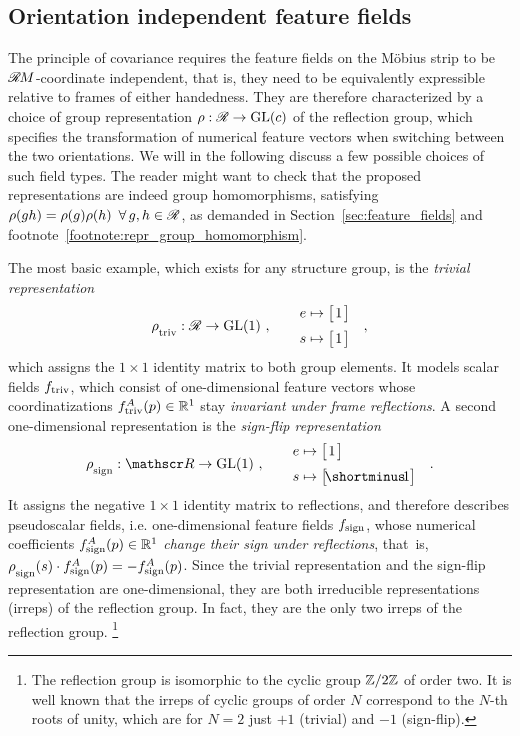\subsection{Orientation independent feature fields}
\label{sec:mobius_representations}

The principle of covariance requires the feature fields on the M\"obius strip to be $\mathscr{R}\mkern-1.8muM$-coordinate independent, that is, they need to be equivalently expressible relative to frames of either handedness.
They are therefore characterized by a choice of group representation $\rho: \mathscr{R} \to \operatorname{GL}(c)$ of the reflection group, which specifies the transformation of numerical feature vectors when switching between the two orientations.
We will in the following discuss a few possible choices of such field types.
The reader might want to check that the proposed representations are indeed group homomorphisms, satisfying $\rho(gh) = \rho(g)\rho(h)\,\ \forall\, g,h\in \mathscr{R}$, as demanded in Section~\ref{sec:feature_fields} and footnote~\ref{footnote:repr_group_homomorphism}.

The most basic example, which exists for any structure group, is the \emph{trivial representation}
\begin{align}
    \rho_{\overset{}{\textup{triv}}}: \mathscr{R} \to \operatorname{GL}(1)\ , \qquad 
    \begin{aligned}
        e &\mapsto \big[\mkern2mu 1 \mkern2mu\big] \\[2pt]
        s &\mapsto \big[\mkern2mu 1 \mkern2mu\big] \\
    \end{aligned}
    \quad ,
\end{align}
which assigns the ${1\!\times\!1}$ identity matrix to both group elements.
It models scalar fields $f_{\textup{triv}}$, which consist of one-dimensional feature vectors whose coordinatizations $f^A_{\textup{triv}}(p) \in \mathbb{R}^1$ stay \emph{invariant under frame reflections}.
A second one-dimensional representation is the \emph{sign-flip representation}
\begin{align}
    \rhosign: \Flip \to \GL{1}\ , \qquad 
    \begin{aligned}
        e &\mapsto \big[\mkern2mu 1 \mkern2mu\big] \\[2pt]
        s &\mapsto \big[\! \shortminus\!1 \big]
    \end{aligned}
    \quad .
\end{align}
It assigns the negative ${1\!\times\!1}$ identity matrix to reflections, and therefore describes pseudoscalar fields, i.e. one-dimensional feature fields $f_{\textup{sign}}$, whose numerical coefficients $f^A_{\textup{sign}}(p) \in \mathbb{R}^1$ \emph{change their sign under reflections}, \mbox{that is,} ${\rho_{\overset{}{\textup{sign}}}(s)\cdot f^A_{\textup{sign}}(p) = -f^A_{\textup{sign}}(p)}$.
Since the trivial representation and the sign-flip representation are one-dimensional, they are both irreducible representations (irreps) of the reflection group.
In fact, they are the only two irreps of the reflection group.%
\footnote{
    The reflection group is isomorphic to the cyclic group $\mathbb{Z}/2\mathbb{Z}$ of order two.
    It is well known that the irreps of cyclic groups of order $N$ correspond to the $N$-th roots of unity, which are for $N=2$ just $+1$ (trivial) and $-1$ (sign-flip).
}

